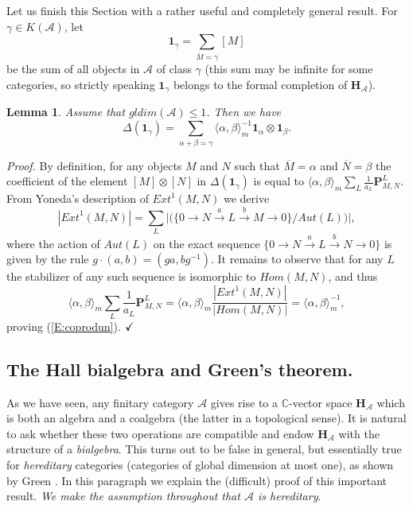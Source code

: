 \documentclass[a4paper,10pt]{amsart}
\def\H{\mathbf{H}}
\def\qed{$\hfill \checkmark$}
\def\a{\alpha}
\def\b{\beta}
\def\C{\mathbb{C}}
\def\A{\mathcal{A}}
\newtheorem{lem}[theo]{Lemma}
\numberwithin{equation}{section}
\begin{document}
Let us finish this Section with a rather useful and completely general result. For $\gamma \in K(\mathcal{A})$, let
$$\mathbf{1}_{\gamma}=\sum_{\overline{M}=\gamma} [M]$$
be the sum of all objects in $\A$ of class $\gamma$ (this sum may be infinite for some categories, so strictly speaking $\mathbf{1}_{\gamma}$ belongs to the formal completion of $\H_{\A}$).

\vspace{.1in}

\begin{lem}\label{L:coprodun} Assume that $gldim(\A) \leq 1$. Then we have
\begin{equation}\label{E:coprodun}
{\Delta}(\mathbf{1}_{\gamma})= \sum_{\a+\beta=\gamma} \langle \a,\beta \rangle_m^{-1}
\mathbf{1}_{\a}
\otimes \mathbf{1}_{\b}.
\end{equation}
\end{lem}

\noindent
\textit{Proof.} By definition, for any objects $M$ and
$N$ such that $\overline{M} = \alpha$ and $\overline{N} = \beta$
the coefficient of the element $[M]  \otimes [N]$ in
${\Delta}(\mathbf{1}_{\gamma})$ is equal to $\langle \a,\b \rangle_m
\sum_{L} \frac{1}{a_{L}}
\mathbf{P}^{L}_{M,N}$. From
Yoneda's description of ${Ext}^1(M,N)$ we derive
$$|{Ext}^1(M,N)|=\sum_{L} \big|\big( \{ 0 \to N
\stackrel{a}{\to} L \stackrel{b}{\to}
M \to 0\}/{Aut}(L)\big)\big|,$$
where the action of $Aut(L)$ on the exact sequence $\{ 0 \to N
\stackrel{a}{\to} L \stackrel{b}{\to}
N \to 0\}$ is given by the rule  $g \cdot (a,b)=(ga,bg^{-1})$.
It remains to observe that for any $L$ the stabilizer of any such sequence
is isomorphic to ${Hom}(M,N)$, and thus
$$\langle \a,\b \rangle_m \sum_{L}
\frac{1}{a_{L}}
\mathbf{P}^{L}_{M,N}=\langle \a,\b \rangle_m
\frac{| {Ext}^1(M,N)|}{|{Hom}(M,N)|}=
\langle\a,\b\rangle_m^{-1},$$
proving (\ref{E:coprodun}).
\qed

\vspace{.2in}

\subsection{The Hall bialgebra and Green's theorem.}

\vspace{.15in}

As we have seen, any finitary category $\A$ gives rise to a $\C$-vector space $\H_{\A}$ which is both an algebra and a coalgebra (the latter in a topological sense). It is natural to ask whether these two operations are compatible and endow $\H_{\A}$ with the structure of a \textit{bialgebra}. This turns out to be false in general, but essentially true for \textit{hereditary} categories (categories of global dimension at most one), as shown by Green \cite{Green}. In this paragraph we explain the (difficult) proof of this important result. \textit{We make the assumption throughout that $\A$ is hereditary}.
\end{document}

